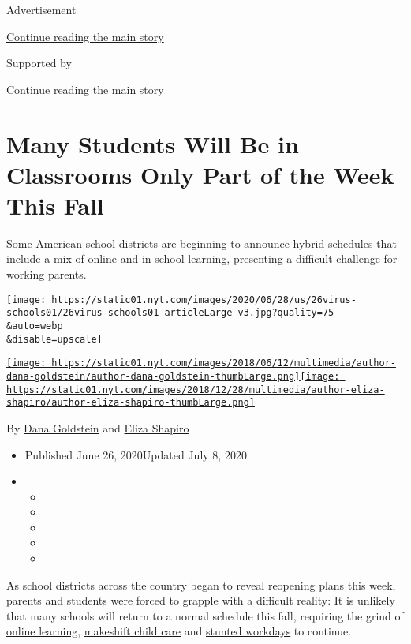 Advertisement

\protect\hyperlink{after-top}{Continue reading the main story}

Supported by

\protect\hyperlink{after-sponsor}{Continue reading the main story}

\hypertarget{many-students-will-be-in-classrooms-only-part-of-the-week-this-fall}{%
\section{Many Students Will Be in Classrooms Only Part of the Week This
Fall}\label{many-students-will-be-in-classrooms-only-part-of-the-week-this-fall}}

Some American school districts are beginning to announce hybrid
schedules that include a mix of online and in-school learning,
presenting a difficult challenge for working parents.

\texttt{[image: https://static01.nyt.com/images/2020/06/28/us/26virus-schools01/26virus-schools01-articleLarge-v3.jpg?quality=75\\\&auto=webp\\\&disable=upscale]}

\href{https://www.nytimes.com/by/dana-goldstein}{\texttt{[image: https://static01.nyt.com/images/2018/06/12/multimedia/author-dana-goldstein/author-dana-goldstein-thumbLarge.png]}}\href{https://www.nytimes.com/by/eliza-shapiro}{\texttt{[image: https://static01.nyt.com/images/2018/12/28/multimedia/author-eliza-shapiro/author-eliza-shapiro-thumbLarge.png]}}

By \href{https://www.nytimes.com/by/dana-goldstein}{Dana Goldstein} and
\href{https://www.nytimes.com/by/eliza-shapiro}{Eliza Shapiro}

\begin{itemize}
\item
  Published June 26, 2020Updated July 8, 2020
\item
  \begin{itemize}
  \item
  \item
  \item
  \item
  \item
  \end{itemize}
\end{itemize}

As school districts across the country began to reveal reopening plans
this week, parents and students were forced to grapple with a difficult
reality: It is unlikely that many schools will return to a normal
schedule this fall, requiring the grind of
\href{https://www.nytimes.com/2020/06/05/us/coronavirus-education-lost-learning.html}{online
learning},
\href{https://www.nytimes.com/2020/05/29/us/coronavirus-child-care-centers.html}{makeshift
child care} and
\href{https://www.nytimes.com/2020/06/03/business/economy/coronavirus-working-women.html}{stunted
workdays} to continue.

